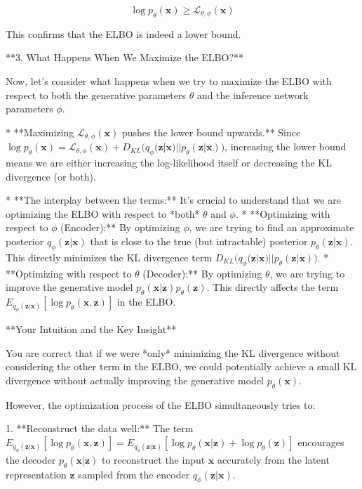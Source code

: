 \documentclass{article}
\begin{document}
\[
\log p_{\theta}(\bm{x}) \ge \mathcal{L}_{\theta, \phi}(\bm{x})
\]

This confirms that the ELBO is indeed a lower bound.

**3. What Happens When We Maximize the ELBO?**

Now, let's consider what happens when we try to maximize the ELBO with respect to both the generative parameters $\theta$ and the inference network parameters $\phi$.

* **Maximizing $\mathcal{L}_{\theta, \phi}(\bm{x})$ pushes the lower bound upwards.**  Since $\log p_{\theta}(\bm{x}) = \mathcal{L}_{\theta, \phi}(\bm{x}) + D_{KL} \big( q_{\phi}(\bm{z} | \bm{x}) || p_{\theta}(\bm{z} | \bm{x}) \big)$, increasing the lower bound means we are either increasing the log-likelihood itself or decreasing the KL divergence (or both).

* **The interplay between the terms:**  It's crucial to understand that we are optimizing the ELBO with respect to *both* $\theta$ and $\phi$.
    * **Optimizing with respect to $\phi$ (Encoder):**  By optimizing $\phi$, we are trying to find an approximate posterior $q_{\phi}(\mathbf{z}|\mathbf{x})$ that is close to the true (but intractable) posterior $p_{\theta}(\mathbf{z}|\mathbf{x})$. This directly minimizes the KL divergence term $D_{KL} \big( q_{\phi}(\bm{z} | \bm{x}) || p_{\theta}(\bm{z} | \bm{x}) \big)$.
    * **Optimizing with respect to $\theta$ (Decoder):** By optimizing $\theta$, we are trying to improve the generative model $p_{\theta}(\mathbf{x}|\mathbf{z})p_{\theta}(\mathbf{z})$. This directly affects the term $E_{q_{\phi}(\bm{z} | \bm{x})} [\log p_{\theta}(\bm{x}, \bm{z})]$ in the ELBO.

**Your Intuition and the Key Insight**

You are correct that if we were *only* minimizing the KL divergence without considering the other term in the ELBO, we could potentially achieve a small KL divergence without actually improving the generative model $p_\theta(\mathbf{x})$.

However, the optimization process of the ELBO simultaneously tries to:

1. **Reconstruct the data well:** The term $E_{q_{\phi}(\bm{z} | \bm{x})} [\log p_{\theta}(\bm{x}, \bm{z})] = E_{q_{\phi}(\bm{z} | \bm{x})} [\log p_{\theta}(\bm{x}|\mathbf{z}) + \log p_{\theta}(\mathbf{z})]$ encourages the decoder $p_{\theta}(\mathbf{x}|\mathbf{z})$ to reconstruct the input $\mathbf{x}$ accurately from the latent representation $\mathbf{z}$ sampled from the encoder $q_{\phi}(\mathbf{z}|\mathbf{x})$.
\end{document}
